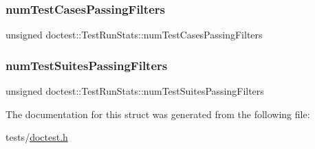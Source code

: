 \subsubsection{\texorpdfstring{num\+Test\+Cases\+Passing\+Filters}{numTestCasesPassingFilters}}
{\footnotesize\ttfamily unsigned doctest\+::\+Test\+Run\+Stats\+::num\+Test\+Cases\+Passing\+Filters}

\mbox{\label{structdoctest_1_1TestRunStats_aecbf62d51a6c96875d72124c27096e1d}} 
\subsubsection{\texorpdfstring{num\+Test\+Suites\+Passing\+Filters}{numTestSuitesPassingFilters}}
{\footnotesize\ttfamily unsigned doctest\+::\+Test\+Run\+Stats\+::num\+Test\+Suites\+Passing\+Filters}



The documentation for this struct was generated from the following file\+:\begin{DoxyCompactItemize}
\item 
tests/\hyperlink{doctest_8h}{doctest.\+h}\end{DoxyCompactItemize}
